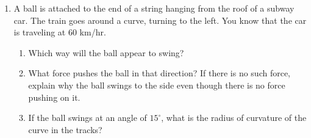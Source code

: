 \documentclass[12pt]{article}
\begin{document}
\begin{enumerate}
%
%





%
%

\item A ball is attached to the end of a string hanging from the roof of a subway car. 
The train goes around a curve, turning to the left. You know that the car is traveling at 60 km/hr.

\begin{enumerate}
\item Which way will the ball appear to swing?
\item What force pushes the ball in that direction? If there is no such force, explain why the ball swings to the side even though there is no force pushing on it.
\item If the ball swings at an angle of $15^\circ$, what is the radius of curvature of the curve in the tracks?
\end{enumerate}


\end{enumerate}
\end{document}
